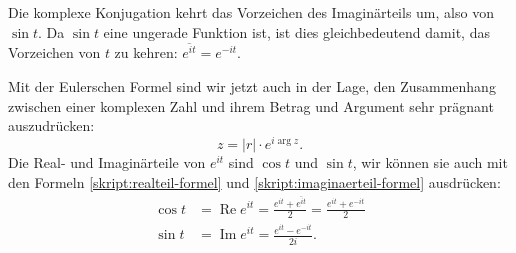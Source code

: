 Die komplexe Konjugation kehrt das Vorzeichen des Imaginärteils um, also 
von $\sin t$. Da $\sin t$ eine ungerade Funktion ist, ist dies gleichbedeutend
damit, das Vorzeichen von $t$ zu kehren: $\overline{e^{it}}=e^{-it}$.

Mit der Eulerschen Formel sind wir jetzt auch in der Lage, den Zusammenhang
zwischen einer komplexen Zahl und ihrem Betrag und Argument sehr prägnant
auszudrücken:
\[
z=|r|\cdot e^{i\operatorname{arg}z}.
\]
Die Real- und Imaginärteile von $e^{it}$ sind $\cos t$ und $\sin t$,
wir können sie auch mit den Formeln \eqref{skript:realteil-formel} und
\eqref{skript:imaginaerteil-formel} ausdrücken:
\begin{align*}
\cos t
&=
\operatorname{Re}e^{it}
=
\frac{e^{it}+\overline{e^{it}}}2
=
\frac{e^{it}+e^{-it}}2
\\
\sin t
&=
\operatorname{Im}e^{it}=\frac{e^{it}-e^{-it}}{2i}.
\end{align*}

